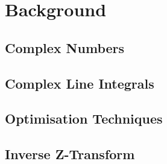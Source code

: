 \chapter{Background}

\section{Complex Numbers}

\section{Complex Line Integrals}

\section{Optimisation Techniques}

\section{Inverse Z-Transform}